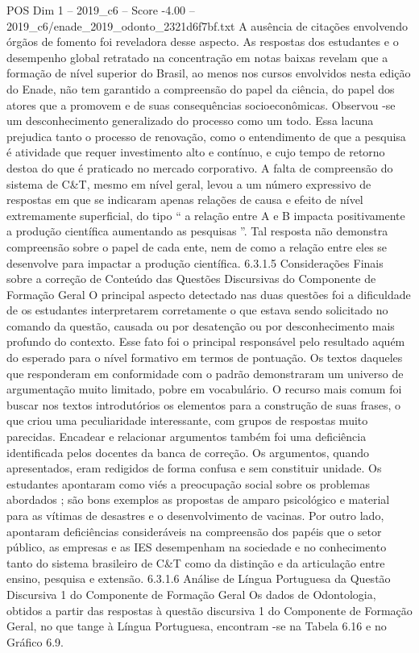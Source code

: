 \begin{textsample}{POS Dim 1 – 2019\_c6 – Score -4.00 – 2019\_c6/enade\_2019\_odonto\_2321d6f7bf.txt}
A ausência de citações envolvendo órgãos de fomento foi reveladora desse aspecto.
As respostas dos estudantes e o desempenho global retratado na concentração em notas baixas revelam que a formação de nível superior do Brasil, ao menos nos cursos envolvidos nesta edição do Enade, não tem garantido a compreensão do papel da ciência, do papel dos atores que a promovem e de suas consequências socioeconômicas.
Observou -se um desconhecimento generalizado do processo como um todo.
Essa lacuna prejudica tanto o processo de renovação, como o entendimento de que a pesquisa é atividade que requer investimento alto e contínuo, e cujo tempo de retorno destoa do que é praticado no mercado corporativo.
A falta de compreensão do sistema de C\&T, mesmo em nível geral, levou a um número expressivo de respostas em que se indicaram apenas relações de causa e efeito de nível extremamente superficial, do tipo “ a relação entre A e B impacta positivamente a produção científica aumentando as pesquisas ”.
Tal resposta não demonstra compreensão sobre o papel de cada ente, nem de como a relação entre eles se desenvolve para impactar a produção científica. 6.3.1.5 Considerações Finais sobre a correção de Conteúdo das Questões Discursivas do Componente de Formação Geral O principal aspecto detectado nas duas questões foi a dificuldade de os estudantes interpretarem corretamente o que estava sendo solicitado no comando da questão, causada ou por desatenção ou por desconhecimento mais profundo do contexto.
Esse fato foi o principal responsável pelo resultado aquém do esperado para o nível formativo em termos de pontuação.
Os textos daqueles que responderam em conformidade com o padrão demonstraram um universo de argumentação muito limitado, pobre em vocabulário.
O recurso mais comum foi buscar nos textos introdutórios os elementos para a construção de suas frases, o que criou uma peculiaridade interessante, com grupos de respostas muito parecidas.
Encadear e relacionar argumentos também foi uma deficiência identificada pelos docentes da banca de correção.
Os argumentos, quando apresentados, eram redigidos de forma confusa e sem constituir unidade.
Os estudantes apontaram como viés a preocupação social sobre os problemas abordados ; são bons exemplos as propostas de amparo psicológico e material para as vítimas de desastres e o desenvolvimento de vacinas.
Por outro lado, apontaram deficiências consideráveis na compreensão dos papéis que o setor público, as empresas e as IES desempenham na sociedade e no conhecimento tanto do sistema brasileiro de C\&T como da distinção e da articulação entre ensino, pesquisa e extensão. 6.3.1.6 Análise de Língua Portuguesa da Questão Discursiva 1 do Componente de Formação Geral Os dados de Odontologia, obtidos a partir das respostas à questão discursiva 1 do Componente de Formação Geral, no que tange à Língua Portuguesa, encontram -se na Tabela 6.16 e no Gráfico 6.9.

\end{textsample}
